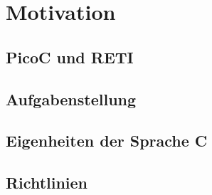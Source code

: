 \chapter{Motivation}
\label{ch:motivation}

\section{PicoC und RETI}
\section{Aufgabenstellung}
\section{Eigenheiten der Sprache C}
\section{Richtlinien}
